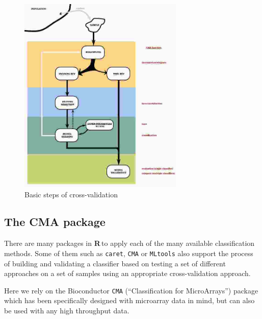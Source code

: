 \documentclass{article}\usepackage[]{graphicx}\usepackage[]{color}
\makeatletter
\newenvironment{kframe}{%
 \def\at@end@of@kframe{}%
 \ifinner\ifhmode%
  \def\at@end@of@kframe{\end{minipage}}%
  \begin{minipage}{\columnwidth}%
 \fi\fi%
 \def\FrameCommand##1{\hskip\@totalleftmargin \hskip-\fboxsep
 \colorbox{shadecolor}{##1}\hskip-\fboxsep
     \hskip-\linewidth \hskip-\@totalleftmargin \hskip\columnwidth}%
 \MakeFramed {\advance\hsize-\width
   \@totalleftmargin\z@ \linewidth\hsize
   \@setminipage}}%
 {\par\unskip\endMakeFramed%
 \at@end@of@kframe}
\newenvironment{knitrout}{}{} %
\newcommand{\R}{\textbf{R}\,}
\makeatother
\begin{document}
\begin{figure}
\includegraphics[width=0.7\textwidth]{images/biomarkerValidationScheme}
\caption{Basic steps of cross-validation\label{validation}}
\end{figure}

\subsection{The CMA package}

There are many packages in \R to apply each of the many available
classification methods.  Some of them such as \texttt{caret}, \texttt{CMA} or \texttt{MLtools} also support the process of
building and validating a classifier based on testing a set of
different approaches on a set of samples using an appropriate
cross-validation approach. 

Here we rely on the Bioconductor \texttt{CMA} (``Classification for MicroArrays'') package which has been
specifically designed with microarray data in mind, but can also be used with any high throughput data.

\begin{knitrout}
\color{fgcolor}\begin{kframe}


{\ttfamily\noindent\itshape\color{messagecolor}{\#\# Loading required package: glmnet}}

{\ttfamily\noindent\itshape\color{messagecolor}{\#\# Loading required package: Matrix}}

{\ttfamily\noindent\itshape\color{messagecolor}{\#\# Loading required package: foreach}}

{\ttfamily\noindent\itshape\color{messagecolor}{\#\# Loaded glmnet 2.0-16}}\end{kframe}
\end{knitrout}
\end{document}
